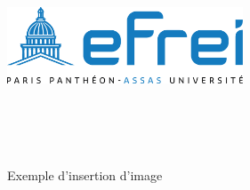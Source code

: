 \lipsum[20]

\begin{figure}[h]
    \centering
    \includegraphics[width=70mm, height=70mm]{images/logo_efrei.png}
    \caption{Exemple d'insertion d'image}
    \label{img:mesh1}
\end{figure}

\newpage